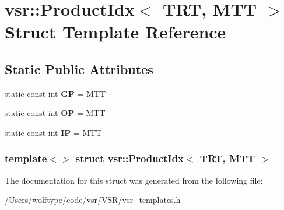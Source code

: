 \hypertarget{structvsr_1_1_product_idx_3_01_t_r_t_00_01_m_t_t_01_4}{\section{vsr\-:\-:Product\-Idx$<$ T\-R\-T, M\-T\-T $>$ Struct Template Reference}
\label{structvsr_1_1_product_idx_3_01_t_r_t_00_01_m_t_t_01_4}
}
\subsection*{Static Public Attributes}
\begin{DoxyCompactItemize}
\item 
\hypertarget{structvsr_1_1_product_idx_3_01_t_r_t_00_01_m_t_t_01_4_aa45d3b22da5c27ee87f06a100dba7252}{static const int {\bfseries G\-P} = M\-T\-T}\label{structvsr_1_1_product_idx_3_01_t_r_t_00_01_m_t_t_01_4_aa45d3b22da5c27ee87f06a100dba7252}

\item 
\hypertarget{structvsr_1_1_product_idx_3_01_t_r_t_00_01_m_t_t_01_4_a59d64c12e0f52535852cf641fae191db}{static const int {\bfseries O\-P} = M\-T\-T}\label{structvsr_1_1_product_idx_3_01_t_r_t_00_01_m_t_t_01_4_a59d64c12e0f52535852cf641fae191db}

\item 
\hypertarget{structvsr_1_1_product_idx_3_01_t_r_t_00_01_m_t_t_01_4_aa5bd319ba16449dfdd5645bd6326a43f}{static const int {\bfseries I\-P} = M\-T\-T}\label{structvsr_1_1_product_idx_3_01_t_r_t_00_01_m_t_t_01_4_aa5bd319ba16449dfdd5645bd6326a43f}

\end{DoxyCompactItemize}
\subsubsection*{template$<$$>$ struct vsr\-::\-Product\-Idx$<$ T\-R\-T, M\-T\-T $>$}



The documentation for this struct was generated from the following file\-:\begin{DoxyCompactItemize}
\item 
/\-Users/wolftype/code/vsr/\-V\-S\-R/vsr\-\_\-templates.\-h\end{DoxyCompactItemize}
